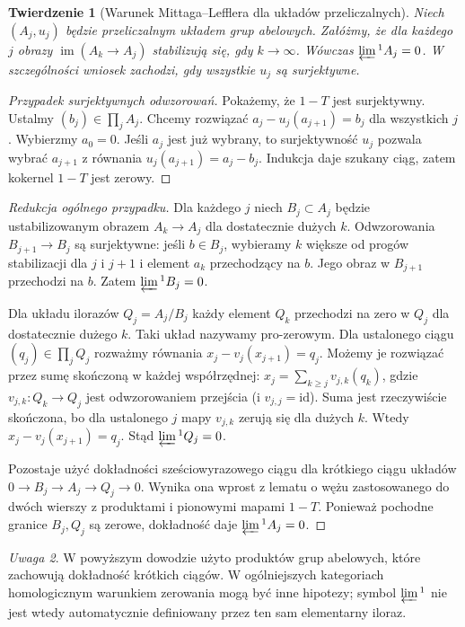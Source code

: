 \documentclass[11pt,a4paper,oneside]{report}
\newcommand{\id}{\mathrm{id}}
\theoremstyle{plain}
\newtheorem{twierdzenie}{Twierdzenie}[section]
\theoremstyle{definition}
\theoremstyle{remark}
\newtheorem{uwaga}[twierdzenie]{Uwaga}
\begin{document}
\begin{twierdzenie}[Warunek Mittaga--Lefflera dla układów przeliczalnych]
\label{thm:xviii-ml}
Niech $(A_j,u_j)$ będzie przeliczalnym układem grup abelowych.
Załóżmy, że dla każdego $j$ obrazy
$\operatorname{im}(A_k\to A_j)$ stabilizują się, gdy $k\to\infty$.
Wówczas $\varprojlim{}^1 A_j=0$.
W szczególności wniosek zachodzi, gdy wszystkie $u_j$ są surjektywne.
\end{twierdzenie}
\begin{proof}[Przypadek surjektywnych odwzorowań]
Pokażemy, że $1-T$ jest surjektywny. Ustalmy
$(b_j)\in\prod_jA_j$. Chcemy rozwiązać
$a_j-u_j(a_{j+1})=b_j$ dla wszystkich $j$.
Wybierzmy $a_0=0$. Jeśli $a_j$ jest już wybrany, to
surjektywność $u_j$ pozwala wybrać $a_{j+1}$ z równania
$u_j(a_{j+1})=a_j-b_j$. Indukcja daje szukany ciąg,
zatem kokernel $1-T$ jest zerowy.
\end{proof}
\begin{proof}[Redukcja ogólnego przypadku]
Dla każdego $j$ niech $B_j\subset A_j$ będzie ustabilizowanym
obrazem $A_k\to A_j$ dla dostatecznie dużych $k$.
Odwzorowania $B_{j+1}\to B_j$ są surjektywne: jeśli
$b\in B_j$, wybieramy $k$ większe od progów stabilizacji dla
$j$ i $j+1$ i element $a_k$ przechodzący na $b$. Jego obraz
w $B_{j+1}$ przechodzi na $b$. Zatem $\varprojlim{}^1 B_j=0$.

Dla układu ilorazów $Q_j=A_j/B_j$ każdy element $Q_k$
przechodzi na zero w $Q_j$ dla dostatecznie dużego $k$.
Taki układ nazywamy pro-zerowym. Dla ustalonego ciągu
$(q_j)\in\prod_j Q_j$ rozważmy równania
$x_j-v_j(x_{j+1})=q_j$. Możemy je rozwiązać przez sumę
skończoną w każdej współrzędnej:
$x_j=\sum_{k\ge j}v_{j,k}(q_k)$, gdzie
$v_{j,k}:Q_k\to Q_j$ jest odwzorowaniem przejścia
(i $v_{j,j}=\id$). Suma jest rzeczywiście skończona,
bo dla ustalonego $j$ mapy $v_{j,k}$ zerują się dla dużych $k$.
Wtedy $x_j-v_j(x_{j+1})=q_j$. Stąd $\varprojlim{}^1Q_j=0$.

Pozostaje użyć dokładności sześciowyrazowego ciągu dla
krótkiego ciągu układów $0\to B_j\to A_j\to Q_j\to0$.
Wynika ona wprost z lematu o wężu zastosowanego do
dwóch wierszy z produktami i pionowymi mapami $1-T$.
Ponieważ pochodne granice $B_j,Q_j$ są zerowe,
dokładność daje $\varprojlim{}^1A_j=0$.
\end{proof}
\begin{uwaga}
W powyższym dowodzie użyto produktów grup abelowych,
które zachowują dokładność krótkich ciągów. W ogólniejszych
kategoriach homologicznym warunkiem zerowania mogą być inne
hipotezy; symbol $\varprojlim{}^1$ nie jest wtedy automatycznie
definiowany przez ten sam elementarny iloraz.
\end{uwaga}
\end{document}

